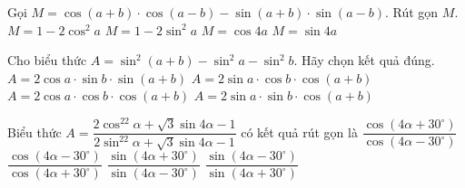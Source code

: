 \begin{ex}%
	Gọi  $M=\cos \left(a+b\right)\cdot \cos \left(a-b\right)-\sin \left(a+b\right)\cdot \sin \left(a-b\right)$. Rút gọn $M$.
	\choice 
		{$M=1-2\cos ^2a$} 
		{\True  $M=1-2\sin ^2a$}
		{$M=\cos  4a$}
		{$M=\sin 4a$} 
\end{ex}

\begin{ex}%
	Cho biểu thức  $A=\sin ^2\left(a+b\right)-\sin ^2a-\sin ^2b$. Hãy chọn kết quả đúng.
	 \choice
		{$A=2\cos a\cdot\sin  b\cdot \sin\left(a+b\right)$}
		{$A=2\sin a\cdot  \cos b\cdot\cos\left(a+b\right)$}
		{$A=2\cos a\cdot\cos b\cdot  \cos\left(a+b\right)$}
		{\True $A=2\sin a\cdot  \sin b\cdot\cos\left(a+b\right)$}
\end{ex}

\begin{ex}%
	Biểu thức $A=\dfrac{2\cos^22\alpha+\sqrt 3\sin 4\alpha-1}{2\sin^22\alpha+\sqrt  3\sin 4\alpha-1}$ có kết quả rút gọn là
	\choice 
		 {$\dfrac{\cos\left(4\alpha+30^\circ\right)}{\cos\left(4\alpha-30^\circ\right)}$}
		 {$\dfrac{\cos\left(4\alpha-30^\circ\right)}{\cos\left(4\alpha+30^\circ\right)}$}
		{\True $\dfrac{\sin\left(4\alpha+30^\circ\right)}{\sin\left(4\alpha-30^\circ\right)}$} 
		 {$\dfrac{\sin\left(4\alpha-30^\circ\right)}{\sin\left(4\alpha+30^\circ\right)}$}
\end{ex}


